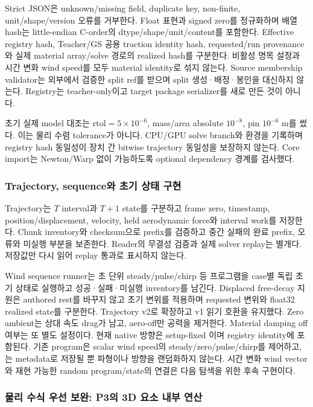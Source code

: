 \documentclass[10pt]{article}
\begin{document}
Strict JSON은 unknown/missing field, duplicate key, non-finite, unit/shape/version 오류를 거부한다.
Float 표현과 signed zero를 정규화하며 배열 hash는 little-endian C-order의 dtype/shape/unit/content를
포함한다. Effective registry hash, Teacher/GS 공용 traction identity hash, requested/run provenance와
실제 material array/solve 경로의 realized hash를 구분한다.
비활성 명목 설정과 시간 변화 wind speed를 모두 material identity로 섞지 않는다.
Source membership validator는 외부에서 검증한 split ref를 받으며 split 생성·배정·봉인을 대신하지 않는다.
Registry는 teacher-only이고 target package serializer를 새로 만든 것이 아니다.

초기 실제 model 대조는 \(\mathrm{rtol}=5\times10^{-6}\), mass/area absolute \(10^{-8}\),
pin \(10^{-6}\) m를 썼다. 이는 물리 수렴 tolerance가 아니다.
CPU/GPU solve branch와 환경을 기록하며 registry hash 동일성이 장치 간 bitwise trajectory 동일성을
보장하지 않는다. Core import는 Newton/Warp 없이 가능하도록 optional dependency 경계를 검사했다.

\subsubsection{Trajectory, sequence와 초기 상태 구현}

Trajectory는 \(T\) interval과 \(T+1\) state를 구분하고 frame zero, timestamp, position/displacement,
velocity, held aerodynamic force와 interval work를 저장한다. Chunk inventory와 checksum으로 prefix를
검증하고 중간 실패의 완료 prefix, 오류와 미실행 부분을 보존한다. Reader의 무결성 검증과 실제 solver
replay는 별개다. 저장값만 다시 읽어 replay 통과로 표시하지 않는다.

Wind sequence runner는 초 단위 steady/pulse/chirp 등 프로그램을 case별 독립 초기 상태로 실행하고
성공·실패·미실행 inventory를 남긴다. Displaced free-decay 지원은 authored rest를 바꾸지 않고
초기 변위를 적용하며 requested 변위와 float32 realized state를 구분한다. Trajectory v2로 확장하고
v1 읽기 호환을 유지했다. Zero ambient는 상대 속도 drag가 남고, aero-off만 공력을 제거한다.
Material damping off 여부는 또 별도 설정이다.
현재 native 방향은 setup-fixed 이며 registry identity에 포함된다.
기존 program은 scalar wind speed의 steady/zero/pulse/chirp를 제어하고,
는 metadata로 저장될 뿐 파형이나 방향을 랜덤화하지 않는다.
시간 변화 wind vector와 재현 가능한 random program/state의 연결은 다음 탐색을 위한 후속 구현이다.

\subsubsection{물리 수식 우선 보완: P3의 3D 요소 내부 연산}
\label{sec:r1-p3-surface-equations}
\end{document}
